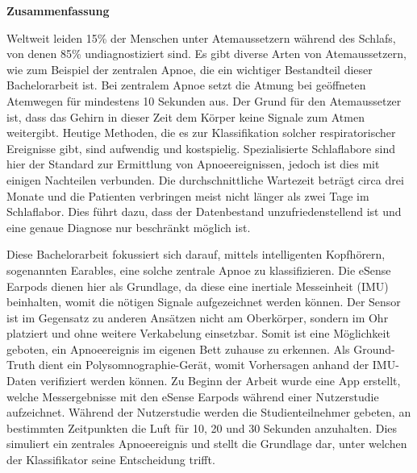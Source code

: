 % 
% 

\vspace*{1em}
\begin{center}
	\textbf{Zusammenfassung}
\end{center}
\par
Weltweit leiden 15\% der Menschen unter Atemaussetzern während des Schlafs, von denen 85\% undiagnostiziert sind. 
Es gibt diverse Arten von Atemaussetzern, wie zum Beispiel der zentralen Apnoe, die ein wichtiger Bestandteil dieser Bachelorarbeit ist.
Bei zentralem Apnoe setzt die Atmung bei geöffneten Atemwegen für mindestens 10 Sekunden aus. Der Grund für den Atemaussetzer ist, dass das Gehirn in dieser Zeit dem Körper keine Signale zum Atmen weitergibt.
Heutige Methoden, die es zur Klassifikation solcher respiratorischer Ereignisse gibt, sind aufwendig und kostspielig. 
Spezialisierte Schlaflabore sind hier der Standard zur Ermittlung von Apnoeereignissen, jedoch ist dies mit einigen Nachteilen verbunden.
Die durchschnittliche Wartezeit beträgt circa drei Monate und die Patienten verbringen meist nicht länger als zwei Tage im Schlaflabor.
Dies führt dazu, dass der Datenbestand unzufriedenstellend ist und eine genaue Diagnose nur beschränkt möglich ist.

Diese Bachelorarbeit fokussiert sich darauf, mittels intelligenten Kopfhörern, sogenannten Earables, eine solche zentrale Apnoe zu klassifizieren.
Die eSense Earpods dienen hier als Grundlage, da diese eine inertiale Messeinheit (IMU) beinhalten, womit die nötigen Signale aufgezeichnet werden können. 
Der Sensor ist im Gegensatz zu anderen Ansätzen nicht am Oberkörper, sondern im Ohr platziert und ohne weitere Verkabelung einsetzbar.
Somit ist eine Möglichkeit geboten, ein Apnoeereignis im eigenen Bett zuhause zu erkennen.
Als Ground-Truth dient ein Polysomnographie-Gerät, womit Vorhersagen anhand der IMU-Daten verifiziert werden können.
Zu Beginn der Arbeit wurde eine App erstellt, welche Messergebnisse mit den eSense Earpods während einer Nutzerstudie aufzeichnet.
Während der Nutzerstudie werden die Studienteilnehmer gebeten, an bestimmten Zeitpunkten die Luft für 10, 20 und 30 Sekunden anzuhalten.
Dies simuliert ein zentrales Apnoeereignis und stellt die Grundlage dar, unter welchen der Klassifikator seine Entscheidung trifft.

